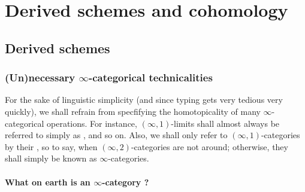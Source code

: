 \chapter{Derived schemes and cohomology}
    \begin{abstract}
        
    \end{abstract}
    
    \minitoc

    \section{Derived schemes}
        \subsection{(Un)necessary \texorpdfstring{$\infty$}{}-categorical technicalities}
            \begin{convention}
                For the sake of linguistic simplicity (and since typing \say{$\infty$} gets very tedious very quickly), we shall refrain from specfifying the homotopicality of many $\infty$-categorical operations. For instance, $(\infty, 1)$-limits shall almost always be referred to simply as , and so on. Also, we shall only refer to $(\infty, 1)$-categories by their , so to say, when $(\infty, 2)$-categories are not around; otherwise, they shall simply be known as $\infty$-categories.
            \end{convention}
            
            \subsubsection{What on earth is an \texorpdfstring{$\infty$}{}-category ?}
        

